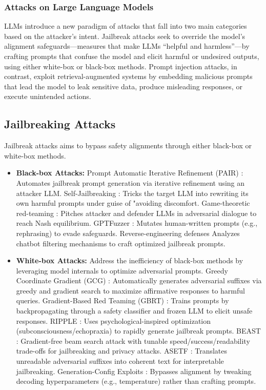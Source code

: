 \documentclass[../main.tex]{subfiles}
\begin{document}
\subsubsection{Attacks on Large Language Models}
LLMs introduce a new paradigm of attacks that fall into two main categories based on the attacker’s intent. Jailbreak attacks seek to override the model’s alignment safeguards—measures that make LLMs “helpful and harmless”—by crafting prompts that confuse the model and elicit harmful or undesired outputs, using either white-box or black-box methods. Prompt injection attacks, in contrast, exploit retrieval-augmented systems by embedding malicious prompts that lead the model to leak sensitive data, produce misleading responses, or execute unintended actions.
\subsection{Jailbreaking Attacks}
Jailbreak attacks aims to bypass safety alignments through either black-box or white-box methods.
 \begin{itemize}
        \item \textbf{Black-box Attacks:} Prompt Automatic Iterative Refinement (PAIR) \cite{chao2025jailbreaking}: Automates jailbreak prompt generation via iterative refinement using an attacker LLM. Self-Jailbreaking \cite{app14093558}: Tricks the target LLM into rewriting its own harmful prompts under guise of "avoiding discomfort. Game-theoretic red-teaming \cite{ma2024evolvingdiverseredteamlanguage}: Pitches attacker and defender LLMs in adversarial dialogue to reach Nash equilibrium.
         GPTFuzzer \cite{yu2024gptfuzzerredteaminglarge}: Mutates human-written prompts (e.g., rephrasing) to evade safeguards. Reverse-engineering defenses \cite{Deng_2024} Analyzes chatbot filtering mechanisms to craft optimized jailbreak prompts.
         \item \textbf{White-box Attacks:} Address the inefficiency of black-box methods by leveraging model internals to optimize adversarial prompts. Greedy Coordinate Gradient (GCG) \cite{zou2023universaltransferableadversarialattacks}: Automatically generates adversarial suffixes via greedy and gradient search to maximize affirmative responses to harmful queries. Gradient-Based Red Teaming (GBRT) \cite{wichers2024gradientbasedlanguagemodelred}: Trains prompts by backpropagating through a safety classifier and frozen LLM to elicit unsafe responses. RIPPLE \cite{shen2024rapidoptimizationjailbreakingllms}: Uses psychological-inspired optimization (subconsciousness/echopraxia) to rapidly generate jailbreak prompts. BEAST \cite{sadasivan2024fastadversarialattackslanguage}: Gradient-free beam search attack with tunable speed/success/readability trade-offs for jailbreaking and privacy attacks. ASETF \cite{wang2024asetfnovelmethodjailbreak}: Translates unreadable adversarial suffixes into coherent text for interpretable jailbreaking. Generation-Config Exploits \cite{huang2023catastrophicjailbreakopensourcellms}: Bypasses alignment by tweaking decoding hyperparameters (e.g., temperature) rather than crafting prompts.
    \end{itemize}
\end{document}

